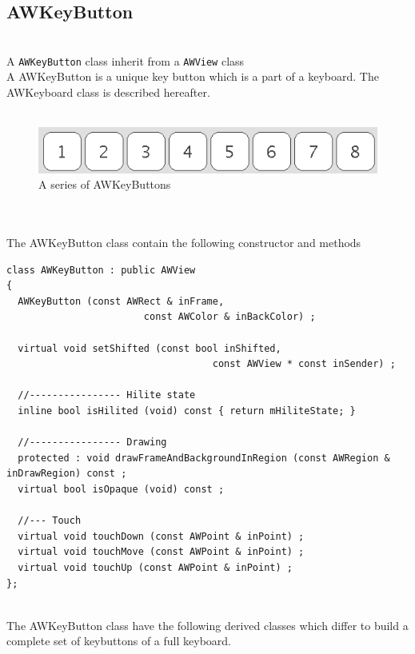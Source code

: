 \documentclass[a4paper,11pt]{extarticle}
\begin{document}
\newpage
\subsection{AWKeyButton}

~\\ A \texttt{AWKeyButton} class inherit from a \texttt{AWView} class
~\\ A AWKeyButton is a unique key button which is a part of a keyboard. The AWKeyboard class is described hereafter.
~\\
~\\

\begin{figure}[htbp]
   \centering
   \includegraphics[scale=0.6]{AWFig17.png} 
   \caption{A series of AWKeyButtons}
   \label{fig:17}
\end{figure}

~\\

~\\ The AWKeyButton class contain the following constructor and methods

\begin{lstlisting}[language=Arduinonl]
class AWKeyButton : public AWView
{
  AWKeyButton (const AWRect & inFrame,
                        const AWColor & inBackColor) ;
  
  virtual void setShifted (const bool inShifted,
                                    const AWView * const inSender) ;

  //---------------- Hilite state
  inline bool isHilited (void) const { return mHiliteState; }
  
  //---------------- Drawing
  protected : void drawFrameAndBackgroundInRegion (const AWRegion & inDrawRegion) const ;
  virtual bool isOpaque (void) const ;

  //--- Touch
  virtual void touchDown (const AWPoint & inPoint) ;
  virtual void touchMove (const AWPoint & inPoint) ;
  virtual void touchUp (const AWPoint & inPoint) ;
};
\end{lstlisting}

~\\ The AWKeyButton class have the following derived classes which differ to build a complete set of keybuttons of a full keyboard.
\end{document}
